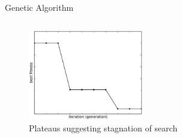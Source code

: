 \documentclass{beamer}
\begin{document}
\begin{frame}{Genetic Algorithm}
\begin{columns}
\begin{column}{0.3\linewidth}
{\begin{figure}
                    \centerline{\includegraphics[width=5cm]{../paper/FIG/algo_ga}}
                    \caption*{Plateaus suggesting stagnation of search}
                \end{figure}
            }
        \end{column}
    \end{columns}
\end{frame}
\end{document}
